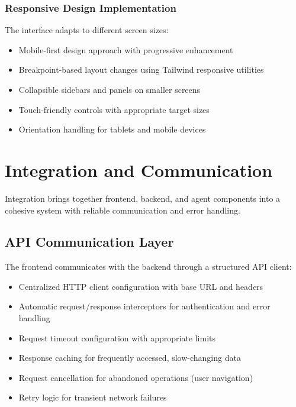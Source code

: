 \subsubsection{Responsive Design Implementation}

The interface adapts to different screen sizes:

\begin{itemize}
    \item Mobile-first design approach with progressive enhancement
    \item Breakpoint-based layout changes using Tailwind responsive utilities
    \item Collapsible sidebars and panels on smaller screens
    \item Touch-friendly controls with appropriate target sizes
    \item Orientation handling for tablets and mobile devices
\end{itemize}

\section{Integration and Communication}

Integration brings together frontend, backend, and agent components into a cohesive system with reliable communication and error handling.

\subsection{API Communication Layer}

The frontend communicates with the backend through a structured API client:

\begin{itemize}
    \item Centralized HTTP client configuration with base URL and headers
    \item Automatic request/response interceptors for authentication and error handling
    \item Request timeout configuration with appropriate limits
    \item Response caching for frequently accessed, slow-changing data
    \item Request cancellation for abandoned operations (user navigation)
    \item Retry logic for transient network failures
\end{itemize}

